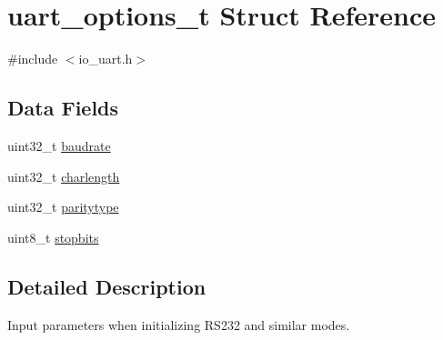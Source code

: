 \hypertarget{structuart__options__t}{\section{uart\+\_\+options\+\_\+t Struct Reference}
\label{structuart__options__t}
}


{\ttfamily \#include $<$io\+\_\+uart.\+h$>$}

\subsection*{Data Fields}
\begin{DoxyCompactItemize}
\item 
uint32\+\_\+t \hyperlink{structuart__options__t_af1331e929d8651ee0add871f01dfa757}{baudrate}
\item 
uint32\+\_\+t \hyperlink{structuart__options__t_addd38e87d5dbf092c320c027ec94816f}{charlength}
\item 
uint32\+\_\+t \hyperlink{structuart__options__t_ad3fade57f7af5f4aae676ac213da8137}{paritytype}
\item 
uint8\+\_\+t \hyperlink{structuart__options__t_a550828453e5dd05b8fbdd0c4cfc1b0e4}{stopbits}
\end{DoxyCompactItemize}


\subsection{Detailed Description}
Input parameters when initializing R\+S232 and similar modes. 

